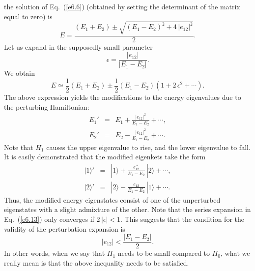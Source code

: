 the solution of Eq.~(\ref{e6.6}) (obtained by setting the determinant of the matrix
equal to zero) is
\begin{equation}
E = \frac{(E_1+E_2) \pm \sqrt{(E_1-E_2)^2 + 4\,|e_{12}|^2}}{2}.
\end{equation}
Let us expand in the supposedly small parameter
\begin{equation}
\epsilon = \frac{|e_{12}|}{|E_1-E_2|}.
\end{equation}
We obtain
\begin{equation}\label{e6.13}
E\simeq \frac{1}{2} (E_1+E_2) \pm \frac{1}{2}(E_1-E_2)(1+2\,\epsilon^2 + \cdots).
\end{equation}
The above expression  yields the modifications to the energy eigenvalues due to
the perturbing Hamiltonian:
\begin{eqnarray}
E_1' &=& E_1 + \frac{|e_{12}|^2}{E_1-E_2} + \cdots,\\[0.5ex]
E_2' &=& E_2 - \frac{|e_{12}|^2}{E_1-E_2} + \cdots.
\end{eqnarray}
Note that $H_1$ causes the upper eigenvalue to rise, and the lower
eigenvalue to fall. It is easily demonstrated that the modified eigenkets
take the form
\begin{eqnarray}
|1\rangle' &=& |1\rangle + \frac{e_{12}^{~\ast}}{E_1-E_2}\, |2\rangle + \cdots,
\\[0.5ex]
|2\rangle' &=& |2\rangle - \frac{e_{12}}{E_1-E_2}\, |1\rangle +\cdots.
\end{eqnarray}
Thus, the modified  energy eigenstates consist of one of the unperturbed eigenstates
with a slight admixture of the other. Note that the series expansion in Eq.~(\ref{e6.13})
only converges if $2\,|\epsilon|<1$. This suggests that the condition for the 
validity of the perturbation expansion is
\begin{equation}
|e_{12}| < \frac{|E_1-E_2|}{2}.
\end{equation}
In other words, when we say that $H_1$ needs to be small compared to $H_0$,
what we really mean is that the above inequality needs to be satisfied.

